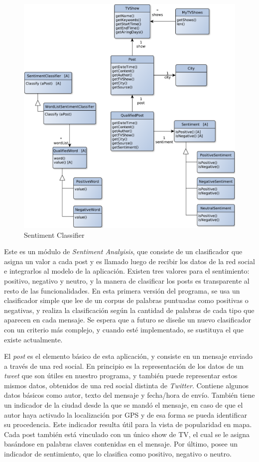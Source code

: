 \begin{figure}[H]
\centering
\includegraphics[width=\textwidth]{graph/clase/classifier.pdf}
\caption{Sentiment Classifier}
\end{figure}

Este es un módulo de \emph{Sentiment Analyisis}, que consiste de un clasificador que asigna un valor a cada post y es llamado luego de recibir los datos de la red social e integrarlos al modelo de la aplicación. Existen tres valores para el sentimiento: positivo, negativo y neutro, y la manera de clasificar los posts es transparente al resto de las funcionalidades. En esta primera versión del programa, se usa un clasificador simple que lee de un corpus de palabras puntuadas como positivas o negativas, y realiza la clasificación según la cantidad de palabras de cada tipo que aparecen en cada mensaje. Se espera que a futuro se diseñe un nuevo clasificador con un criterio más complejo, y cuando esté implementado, se sustituya el que existe actualmente.


El \emph{post} es el elemento básico de esta aplicación, y consiste en un mensaje enviado a través de una red social. En principio es la representación de los datos de un \emph{tweet} que son útiles en nuestro programa, y también puede representar estos mismos datos, obtenidos de una red social distinta de \emph{Twitter}. Contiene algunos datos básicos como autor, texto del mensaje y fecha/hora de envío. También tiene un indicador de la ciudad desde la que se mandó el mensaje, en caso de que el autor haya activado la localización por GPS y de esa forma se pueda identificar su procedencia. Este indicador resulta útil para la vista de popularidad en mapa. Cada post también está vinculado con un único show de TV, el cual se le asigna basándose en palabras claves contenidas en el mensaje. Por último, posee un indicador de sentimiento, que lo clasifica como positivo, negativo o neutro.


